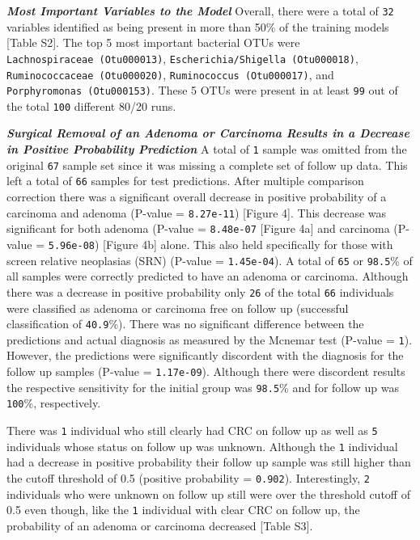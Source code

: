 \documentclass[12pt,]{article}
\begin{document}
\textbf{\emph{Most Important Variables to the Model}} Overall, there
were a total of \texttt{32} variables identified as being present in
more than 50\% of the training models {[}Table S2{]}. The top 5 most
important bacterial OTUs were \texttt{Lachnospiraceae\ (Otu000013)},
\texttt{Escherichia/Shigella\ (Otu000018)},
\texttt{Ruminococcaceae\ (Otu000020)},
\texttt{Ruminococcus\ (Otu000017)}, and
\texttt{Porphyromonas\ (Otu000153)}. These 5 OTUs were present in at
least \texttt{99} out of the total \texttt{100} different 80/20 runs.

\textbf{\emph{Surgical Removal of an Adenoma or Carcinoma Results in a
Decrease in Positive Probability Prediction}} A total of \texttt{1}
sample was omitted from the original \texttt{67} sample set since it was
missing a complete set of follow up data. This left a total of
\texttt{66} samples for test predictions. After multiple comparison
correction there was a significant overall decrease in positive
probability of a carcinoma and adenoma (P-value = \texttt{8.27e-11})
{[}Figure 4{]}. This decrease was significant for both adenoma (P-value
= \texttt{8.48e-07} {[}Figure 4a{]} and carcinoma (P-value =
\texttt{5.96e-08}) {[}Figure 4b{]} alone. This also held specifically
for those with screen relative neoplasias (SRN) (P-value =
\texttt{1.45e-04}). A total of \texttt{65} or \texttt{98.5}\% of all
samples were correctly predicted to have an adenoma or carcinoma.
Although there was a decrease in positive probability only \texttt{26}
of the total \texttt{66} individuals were classified as adenoma or
carcinoma free on follow up (successful classification of
\texttt{40.9}\%). There was no significant difference between the
predictions and actual diagnosis as measured by the Mcnemar test
(P-value = \texttt{1}). However, the predictions were significantly
discordent with the diagnosis for the follow up samples (P-value =
\texttt{1.17e-09}). Although there were discordent results the
respective sensitivity for the initial group was \texttt{98.5}\% and for
follow up was \texttt{100}\%, respectively.

There was \texttt{1} individual who still clearly had CRC on follow up
as well as \texttt{5} individuals whose status on follow up was unknown.
Although the \texttt{1} individual had a decrease in positive
probability their follow up sample was still higher than the cutoff
threshold of 0.5 (positive probability = \texttt{0.902}). Interestingly,
\texttt{2} individuals who were unknown on follow up still were over the
threshold cutoff of 0.5 even though, like the \texttt{1} individual with
clear CRC on follow up, the probability of an adenoma or carcinoma
decreased {[}Table S3{]}.
\end{document}
